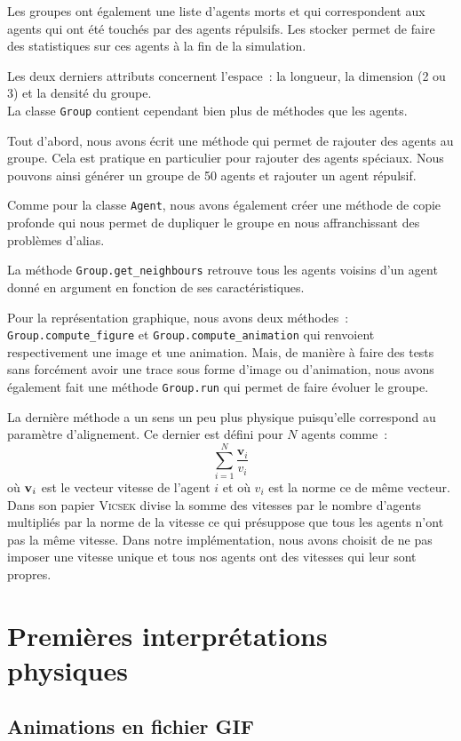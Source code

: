 \documentclass[french, a4paper, 12pt, openany]{report}
\begin{document}
	Les groupes ont également une liste d'agents morts et qui correspondent aux agents qui ont été touchés par des agents répulsifs. Les stocker permet de faire des statistiques sur ces agents à la fin de la simulation.
	
	Les deux derniers attributs concernent l'espace~: la longueur, la dimension (2 ou 3) et la densité du groupe. \\
	
	La classe \verb|Group| contient cependant bien plus de méthodes que les agents.
	
	Tout d'abord, nous avons écrit une méthode qui permet de rajouter des agents au groupe. Cela est pratique en particulier pour rajouter des agents spéciaux. Nous pouvons ainsi générer un groupe de 50 agents et rajouter un agent répulsif.
	
	Comme pour la classe \verb|Agent|, nous avons également créer une méthode de copie profonde qui nous permet de dupliquer le groupe en nous affranchissant des problèmes d'alias.
	
	La méthode \verb|Group.get_neighbours| retrouve tous les agents voisins d'un agent donné en argument en fonction de ses caractéristiques.
	
	Pour la représentation graphique, nous avons deux méthodes~: \verb|Group.compute_figure| et \verb|Group.compute_animation| qui renvoient respectivement une image et une animation. Mais, de manière à faire des tests sans forcément avoir une trace sous forme d'image ou d'animation, nous avons également fait une méthode \verb|Group.run| qui permet de faire évoluer le groupe.
	
	La dernière méthode a un sens un peu plus physique puisqu'elle correspond au paramètre d'alignement. Ce dernier est défini pour $N$ agents comme~:
	\[
		\sum_{i=1}^N \frac{\textbf{v}_i}{v_i}
	\]
	\label{formule_align}
	où $\textbf v_i$ est le vecteur vitesse de l'agent $i$ et où $v_i$ est la norme ce de même vecteur. Dans son papier \textsc{Vicsek} divise la somme des vitesses par le nombre d'agents multipliés par la norme de la vitesse ce qui présuppose que tous les agents n'ont pas la même vitesse. Dans notre implémentation, nous avons choisit de ne pas imposer une vitesse unique et tous nos agents ont des vitesses qui leur sont propres.	

   
\chapter{Premières interprétations physiques}
\section{Animations en fichier GIF}
\end{document}
